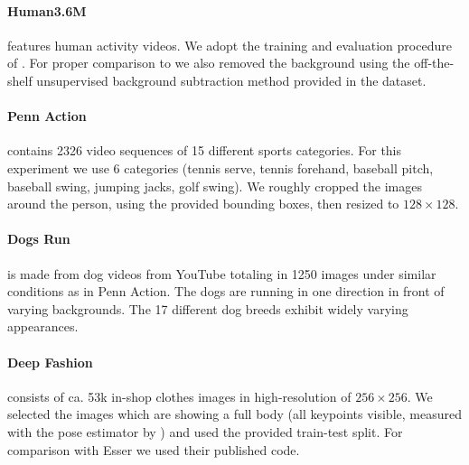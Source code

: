 \paragraph{Human3.6M} \cite{ionescu14human36m} features human activity videos.
We adopt the training and evaluation procedure of \cite{zhang18}.
For proper comparison to \cite{zhang18} we also removed the background using the off-the-shelf unsupervised background subtraction method provided in the dataset.


\paragraph{Penn Action} \cite{zhang13penn} contains 2326 video sequences of 15 different sports categories.
For this experiment we use 6 categories (tennis serve, tennis forehand, baseball pitch, baseball swing, jumping jacks, golf swing).
We roughly cropped the images around the person, using the provided bounding boxes, then resized to $128\times128$.


\paragraph{Dogs Run} is made from dog videos from YouTube totaling in 1250 images under similar conditions as in Penn Action. The dogs are running in one direction in front of varying backgrounds. The 17 different dog breeds exhibit widely varying appearances.


\paragraph{Deep Fashion} \cite{liu16deepfashion, liu16deepfashionwild} consists of ca. 53k in-shop clothes images in high-resolution of $256 \times 256$. We selected the images which are showing a full body (all keypoints visible, measured with the pose estimator by \cite{cao17affinityfield}) and used the provided train-test split.
For comparison with Esser \etal \cite{esser18} we used their published code.


